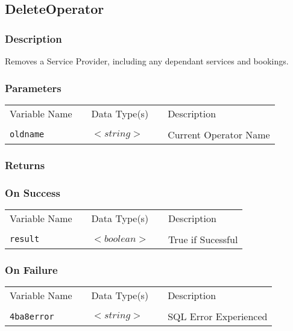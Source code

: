 \subsection{DeleteOperator}

\subsubsection{Description}

Removes a Service Provider, including any dependant services and
bookings.  

\subsubsection{Parameters}

\begin{tabular}{lllll}
Variable Name	&		&	Data Type(s)		&	&	Description	\\
				&	&	&	&	\\
\verb!oldname! & \hspace{15mm} & $<string>$ & \hspace{15mm} & Current Operator Name \\
\end{tabular}

\subsubsection{Returns}

\subsubsection{On Success}

\begin{tabular}{lllll}
Variable Name	&		&	Data Type(s)		&	&	Description	\\
				&	&	&	&	\\
\verb!result! & \hspace{15mm} & $<boolean>$ & \hspace{15mm} & True if Sucessful \\
\end{tabular}

\subsubsection{On Failure}

\begin{tabular}{lllll}
Variable Name	&		&	Data Type(s)		&	&	Description	\\
				&	&	&	&	\\
\verb!4ba8error! & \hspace{15mm} & $<string>$ & \hspace{15mm} & SQL Error Experienced \\
\end{tabular}


